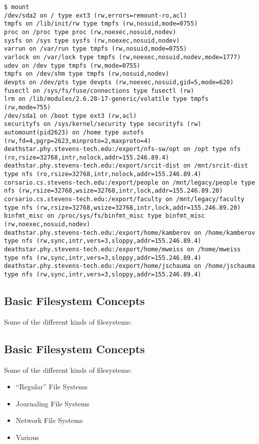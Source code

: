 \documentclass[xga]{xdvislides}
\begin{document}
\small
\begin{verbatim}
$ mount
/dev/sda2 on / type ext3 (rw,errors=remount-ro,acl)
tmpfs on /lib/init/rw type tmpfs (rw,nosuid,mode=0755)
proc on /proc type proc (rw,noexec,nosuid,nodev)
sysfs on /sys type sysfs (rw,noexec,nosuid,nodev)
varrun on /var/run type tmpfs (rw,nosuid,mode=0755)
varlock on /var/lock type tmpfs (rw,noexec,nosuid,nodev,mode=1777)
udev on /dev type tmpfs (rw,mode=0755)
tmpfs on /dev/shm type tmpfs (rw,nosuid,nodev)
devpts on /dev/pts type devpts (rw,noexec,nosuid,gid=5,mode=620)
fusectl on /sys/fs/fuse/connections type fusectl (rw)
lrm on /lib/modules/2.6.28-17-generic/volatile type tmpfs (rw,mode=755)
/dev/sda1 on /boot type ext3 (rw,acl)
securityfs on /sys/kernel/security type securityfs (rw)
automount(pid2623) on /home type autofs (rw,fd=4,pgrp=2623,minproto=2,maxproto=4)
deathstar.phy.stevens-tech.edu:/export/nfs-sw/opt on /opt type nfs (ro,rsize=32768,intr,nolock,addr=155.246.89.4)
deathstar.phy.stevens-tech.edu:/export/srcit-dist on /mnt/srcit-dist type nfs (ro,rsize=32768,intr,nolock,addr=155.246.89.4)
corsario.cs.stevens-tech.edu:/export/people on /mnt/legacy/people type nfs (rw,rsize=32768,wsize=32768,intr,lock,addr=155.246.89.20)
corsario.cs.stevens-tech.edu:/export/faculty on /mnt/legacy/faculty type nfs (rw,rsize=32768,wsize=32768,intr,lock,addr=155.246.89.20)
binfmt_misc on /proc/sys/fs/binfmt_misc type binfmt_misc (rw,noexec,nosuid,nodev)
deathstar.phy.stevens-tech.edu:/export/home/kamberov on /home/kamberov type nfs (rw,sync,intr,vers=3,sloppy,addr=155.246.89.4)
deathstar.phy.stevens-tech.edu:/export/home/mweiss on /home/mweiss type nfs (rw,sync,intr,vers=3,sloppy,addr=155.246.89.4)
deathstar.phy.stevens-tech.edu:/export/home/jschauma on /home/jschauma type nfs (rw,sync,intr,vers=3,sloppy,addr=155.246.89.4)
\end{verbatim}
\Normalsize

\subsection{Basic Filesystem Concepts}
Some of the different kinds of filesystems:

\subsection{Basic Filesystem Concepts}
Some of the different kinds of filesystems:
\begin{itemize}
	\item ``Regular'' File Systems
	\item Journaling File Systems
	\item Network File Systems
	\item Various
\end{itemize}
\end{document}
